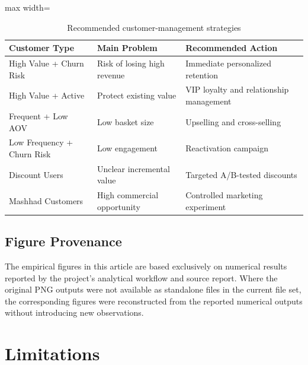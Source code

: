 \documentclass[11pt,a4paper]{article}
\begin{document}
\begin{table}[H]
\centering
\caption{Recommended customer-management strategies}
\label{tab:strategy}
\begin{adjustbox}{max width=\textwidth}
\begin{tabular}{p{3.3cm}p{4cm}p{5cm}}
\toprule
\textbf{Customer Type} &
\textbf{Main Problem} &
\textbf{Recommended Action}\\
\midrule
High Value + Churn Risk &
Risk of losing high revenue &
Immediate personalized retention\\

High Value + Active &
Protect existing value &
VIP loyalty and relationship management\\

Frequent + Low AOV &
Low basket size &
Upselling and cross-selling\\

Low Frequency + Churn Risk &
Low engagement &
Reactivation campaign\\

Discount Users &
Unclear incremental value &
Targeted A/B-tested discounts\\

Mashhad Customers &
High commercial opportunity &
Controlled marketing experiment\\
\bottomrule
\end{tabular}
\end{adjustbox}
\end{table}



\subsection{Figure Provenance}
\label{subsec:figure_provenance}

The empirical figures in this article are based exclusively on numerical
results reported by the project's analytical workflow and source report.
Where the original PNG outputs were not available as standalone files in
the current file set, the corresponding figures were reconstructed from
the reported numerical outputs without introducing new observations.


\section{Limitations}
\end{document}
